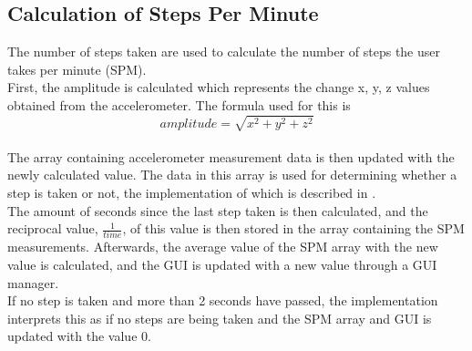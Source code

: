 \subsection{Calculation of Steps Per Minute}
The number of steps taken are used to calculate the number of steps the user takes per minute (SPM).\\

First, the amplitude is calculated which represents the change x, y, z values obtained from the accelerometer. The formula used for this is $$amplitude = \sqrt{x^{2} + y^{2} + z^{2}}$$\\

The array containing accelerometer measurement data is then updated with the newly calculated value. The data in this array is used for determining whether a step is taken or not, the implementation of which is described in .\\

The amount of seconds since the last step taken is then calculated, and the reciprocal value, $\frac{1}{time}$, of this value is then stored in the array containing the SPM measurements. Afterwards, the average value of the SPM array with the new value is calculated, and the GUI is updated with a new value through a GUI manager.\\

If no step is taken and more than 2 seconds have passed, the implementation interprets this as if no steps are being taken and the SPM array and GUI is updated with the value 0.
